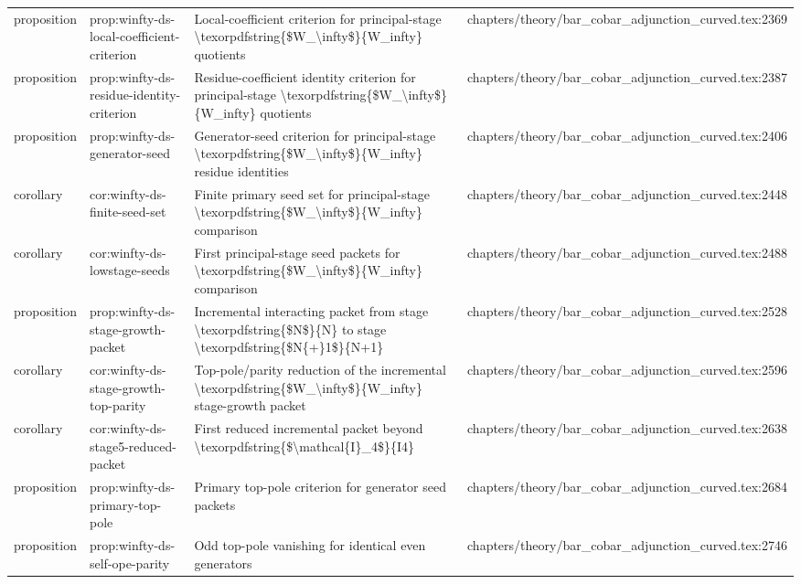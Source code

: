 \documentclass[11pt]{article}
\begin{document}
\begin{longtable}{L{0.10\textwidth}L{0.26\textwidth}L{0.42\textwidth}L{0.22\textwidth}}
proposition & prop:winfty-ds-local-coefficient-criterion & Local-coefficient criterion for principal-stage \textbackslash{}texorpdfstring\{\$W\_\textbackslash{}infty\$\}\{W\_infty\} quotients & chapters/theory/bar\_cobar\_adjunction\_curved.tex:2369\\
proposition & prop:winfty-ds-residue-identity-criterion & Residue-coefficient identity criterion for principal-stage \textbackslash{}texorpdfstring\{\$W\_\textbackslash{}infty\$\}\{W\_infty\} quotients & chapters/theory/bar\_cobar\_adjunction\_curved.tex:2387\\
proposition & prop:winfty-ds-generator-seed & Generator-seed criterion for principal-stage \textbackslash{}texorpdfstring\{\$W\_\textbackslash{}infty\$\}\{W\_infty\} residue identities & chapters/theory/bar\_cobar\_adjunction\_curved.tex:2406\\
corollary & cor:winfty-ds-finite-seed-set & Finite primary seed set for principal-stage \textbackslash{}texorpdfstring\{\$W\_\textbackslash{}infty\$\}\{W\_infty\} comparison & chapters/theory/bar\_cobar\_adjunction\_curved.tex:2448\\
corollary & cor:winfty-ds-lowstage-seeds & First principal-stage seed packets for \textbackslash{}texorpdfstring\{\$W\_\textbackslash{}infty\$\}\{W\_infty\} comparison & chapters/theory/bar\_cobar\_adjunction\_curved.tex:2488\\
proposition & prop:winfty-ds-stage-growth-packet & Incremental interacting packet from stage \textbackslash{}texorpdfstring\{\$N\$\}\{N\} to stage \textbackslash{}texorpdfstring\{\$N\{+\}1\$\}\{N+1\} & chapters/theory/bar\_cobar\_adjunction\_curved.tex:2528\\
corollary & cor:winfty-ds-stage-growth-top-parity & Top-pole/parity reduction of the incremental \textbackslash{}texorpdfstring\{\$W\_\textbackslash{}infty\$\}\{W\_infty\} stage-growth packet & chapters/theory/bar\_cobar\_adjunction\_curved.tex:2596\\
corollary & cor:winfty-ds-stage5-reduced-packet & First reduced incremental packet beyond \textbackslash{}texorpdfstring\{\$\textbackslash{}mathcal\{I\}\_4\$\}\{I4\} & chapters/theory/bar\_cobar\_adjunction\_curved.tex:2638\\
proposition & prop:winfty-ds-primary-top-pole & Primary top-pole criterion for generator seed packets & chapters/theory/bar\_cobar\_adjunction\_curved.tex:2684\\
proposition & prop:winfty-ds-self-ope-parity & Odd top-pole vanishing for identical even generators & chapters/theory/bar\_cobar\_adjunction\_curved.tex:2746\\

\end{longtable}
\end{document}
